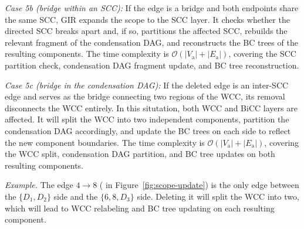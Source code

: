 
\emph{Case 5b (bridge within an SCC):}
If the edge is a bridge and both endpoints share the same SCC, GIR expands the scope to the SCC layer.
It checks whether the directed SCC breaks apart and, if so, partitions the affected SCC, rebuilds the relevant fragment of the condensation DAG, and reconstructs the BC trees of the resulting components.
The time complexity is $\mathcal{O}(|V_{\mathrm{a}}| + |E_{\mathrm{a}}|)$, covering the SCC partition check, condensation DAG fragment update, and BC tree reconstruction.

\emph{Case 5c (bridge in the condensation DAG):}
If the deleted edge is an inter-SCC edge and serves as the bridge connecting two regions of the WCC, its removal disconnects the WCC entirely.
In this situtation, both WCC and BiCC layers are affected. It will split the WCC into two independent components, partition the condensation DAG accordingly, and update the BC trees on each side to reflect the new component boundaries.
The time complexity is $\mathcal{O}(|V_{\mathrm{a}}| + |E_{\mathrm{a}}|)$, covering the WCC split, condensation DAG partition, and BC tree updates on both resulting components.

\textit{Example.} 
The edge $4 \to 8$ ( in Figure~\ref{fig:scope-update}) 
is the only edge between the $\{D_1, D_2\}$ side and the $\{6, 8, D_3\}$ side.
Deleting it will split the WCC into two, which will lead to WCC relabeling and BC tree updating on each resulting component.




